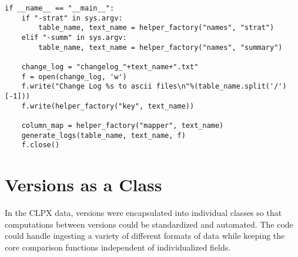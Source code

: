 \begin{verbatim}
if __name__ == "__main__":
	if "-strat" in sys.argv:
		table_name, text_name = helper_factory("names", "strat")
	elif "-summ" in sys.argv:
		table_name, text_name = helper_factory("names", "summary")

	change_log = "changelog_"+text_name+".txt"
	f = open(change_log, 'w')
	f.write("Change Log %s to ascii files\n"%(table_name.split('/')[-1]))
	f.write(helper_factory("key", text_name))

	column_map = helper_factory("mapper", text_name)
	generate_logs(table_name, text_name, f)
	f.close()
\end{verbatim}

\section{Versions as a Class}

In the CLPX data, versions were encapsulated into individual classes so that computations between versions could be standardized and automated.
The code could handle ingesting a variety of different formats of data while keeping the core comparison functions independent of individualized fields.

